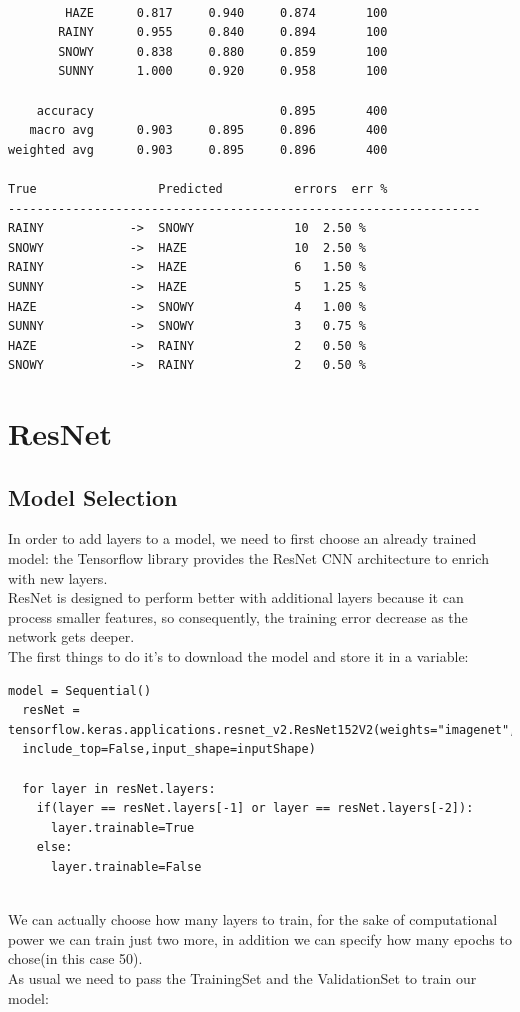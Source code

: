 \documentclass{article}
\begin{document}
\begin{verbatim}

        HAZE      0.817     0.940     0.874       100
       RAINY      0.955     0.840     0.894       100
       SNOWY      0.838     0.880     0.859       100
       SUNNY      1.000     0.920     0.958       100

    accuracy                          0.895       400
   macro avg      0.903     0.895     0.896       400
weighted avg      0.903     0.895     0.896       400

True                 Predicted         	errors 	err % 
------------------------------------------------------------------
RAINY            ->  SNOWY             	10 	2.50 % 
SNOWY            ->  HAZE              	10 	2.50 % 
RAINY            ->  HAZE              	6 	1.50 % 
SUNNY            ->  HAZE              	5 	1.25 % 
HAZE             ->  SNOWY             	4 	1.00 % 
SUNNY            ->  SNOWY             	3 	0.75 % 
HAZE             ->  RAINY             	2 	0.50 % 
SNOWY            ->  RAINY             	2 	0.50 %

\end{verbatim}

\section{ResNet}

\subsection{Model Selection}
In order to add layers to a model, we need to first choose an already trained model: the Tensorflow library provides the ResNet CNN architecture to enrich with new layers.\\
ResNet is designed to perform better with additional layers because it can process smaller features, so consequently, the training error decrease as the network gets deeper.\\
The first things to do it's to download the model and store it in a variable:\\

\begin{verbatim}
model = Sequential()
  resNet = tensorflow.keras.applications.resnet_v2.ResNet152V2(weights="imagenet",
  include_top=False,input_shape=inputShape)

  for layer in resNet.layers:
    if(layer == resNet.layers[-1] or layer == resNet.layers[-2]):
      layer.trainable=True
    else:
      layer.trainable=False
  
\end{verbatim}
We can actually choose how many layers to train, for the sake of computational power we can train just two more, in addition we can specify how many epochs to chose(in this case 50).\\
As usual we need to pass the TrainingSet and the ValidationSet to train our model:
\end{document}
